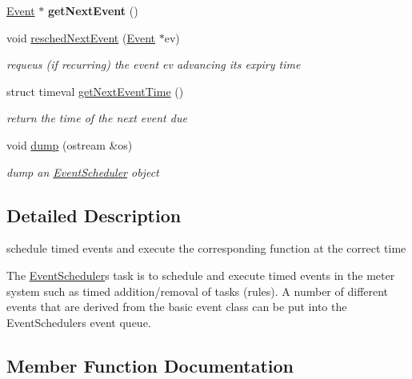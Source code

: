 \begin{DoxyCompactItemize}
\mbox{\label{classEventScheduler_a8c920197e971dc108bfa5847d68696d0}} 
\hyperlink{classEvent}{Event} $\ast$ {\bfseries get\+Next\+Event} ()
\item 
\mbox{\label{classEventScheduler_a44080cd7623b245afdabb2ddfcf7c6a3}} 
void \hyperlink{classEventScheduler_a44080cd7623b245afdabb2ddfcf7c6a3}{resched\+Next\+Event} (\hyperlink{classEvent}{Event} $\ast$ev)
\begin{DoxyCompactList}\small\item\em requeus (if recurring) the event ev advancing its expiry time \end{DoxyCompactList}\item 
\mbox{\label{classEventScheduler_ad77fed3420f8ef0c07a2dbb8e7ccfd3b}} 
struct timeval \hyperlink{classEventScheduler_ad77fed3420f8ef0c07a2dbb8e7ccfd3b}{get\+Next\+Event\+Time} ()
\begin{DoxyCompactList}\small\item\em return the time of the next event due \end{DoxyCompactList}\item 
\mbox{\label{classEventScheduler_ac479416f6764531401c2ca21b774ea52}} 
void \hyperlink{classEventScheduler_ac479416f6764531401c2ca21b774ea52}{dump} (ostream \&os)
\begin{DoxyCompactList}\small\item\em dump an \hyperlink{classEventScheduler}{Event\+Scheduler} object \end{DoxyCompactList}\end{DoxyCompactItemize}


\subsection{Detailed Description}
schedule timed events and execute the corresponding function at the correct time 

The \hyperlink{classEventScheduler}{Event\+Scheduler}\textquotesingle{}s task is to schedule and execute timed events in the meter system such as timed addition/removal of tasks (rules). A number of different events that are derived from the basic event class can be put into the Event\+Schedulers event queue. 

\subsection{Member Function Documentation}
\mbox{\label{classEventScheduler_aa0ece0b48922f1712e0d1057841e1c0f}} 
